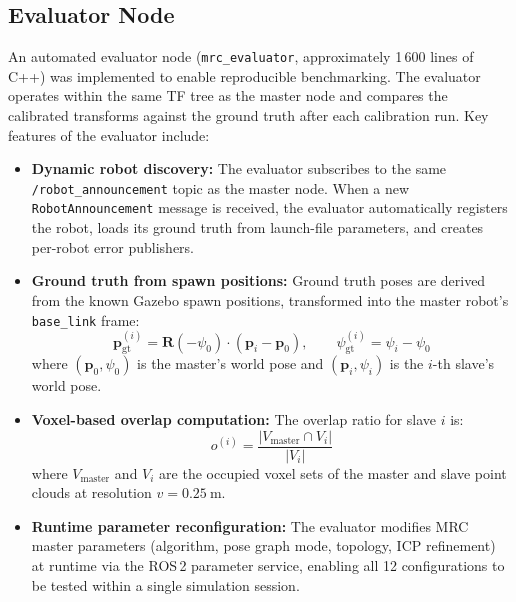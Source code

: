 \subsection{Evaluator Node}
\label{sec:evaluator_node}

An automated evaluator node (\texttt{mrc\_evaluator}, approximately
1\,600 lines of C++) was implemented to enable reproducible
benchmarking.
The evaluator operates within the same TF tree as the master node and
compares the calibrated transforms against the ground truth after each
calibration run.
Key features of the evaluator include:

\begin{itemize}
    \item \textbf{Dynamic robot discovery:}
          The evaluator subscribes to the same
          \texttt{/robot\_announcement} topic as the master node.
          When a new \texttt{RobotAnnouncement} message is received,
          the evaluator automatically registers the robot, loads its
          ground truth from launch-file parameters, and creates per-robot
          error publishers.

    \item \textbf{Ground truth from spawn positions:}
          Ground truth poses are derived from the known Gazebo spawn
          positions, transformed into the master robot's
          \texttt{base\_link} frame:
          \begin{equation}
              \mathbf{p}_\mathrm{gt}^{(i)} = \mathbf{R}(-\psi_0)
              \cdot (\mathbf{p}_i - \mathbf{p}_0), \qquad
              \psi_\mathrm{gt}^{(i)} = \psi_i - \psi_0
          \end{equation}
          where $(\mathbf{p}_0, \psi_0)$ is the master's world pose
          and $(\mathbf{p}_i, \psi_i)$ is the $i$-th slave's world pose.

    \item \textbf{Voxel-based overlap computation:}
          The overlap ratio for slave $i$ is:
          \begin{equation}
              o^{(i)} = \frac{|V_\mathrm{master} \cap V_i|}{|V_i|}
          \end{equation}
          where $V_\mathrm{master}$ and $V_i$ are the occupied voxel
          sets of the master and slave point clouds at resolution
          $v = \SI{0.25}{\metre}$.

    \item \textbf{Runtime parameter reconfiguration:}
          The evaluator modifies MRC master parameters (algorithm,
          pose graph mode, topology, ICP refinement) at runtime via
          the ROS\,2 parameter service, enabling all 12 configurations
          to be tested within a single simulation session.
\end{itemize}

